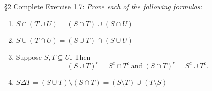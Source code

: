 \documentclass{homework}
\begin{document}
\begin{problem}{\S 2}
  Complete Exercise 1.7: \textit{Prove each of the following formulas:} 
  \begin{enumerate}[label=(\alph*)]
    \item $S\cap \left( T \cup U \right) = \left( S\cap T \right) \cup \left( S\cap U \right)$
    \item $S\cup \left( T\cap U \right) = \left( S\cup T \right) \cap \left( S\cup U \right)$
    \item Suppose $S, T\subseteq U$. Then \[
        \left( S\cup T \right) ^{c} = S^{c}\cap T^{c} ~\text{and}~ \left( S\cap T \right) ^{c}
        =S^{c}\cup T^{c}
      .\] 
    \item $S\Delta T = \left( S\cup T \right) \setminus \left( S\cap T \right) = \left( S\setminus
      T\right) \cup \left( T\setminus S \right) $
  \end{enumerate}
\end{problem}
\end{document}
